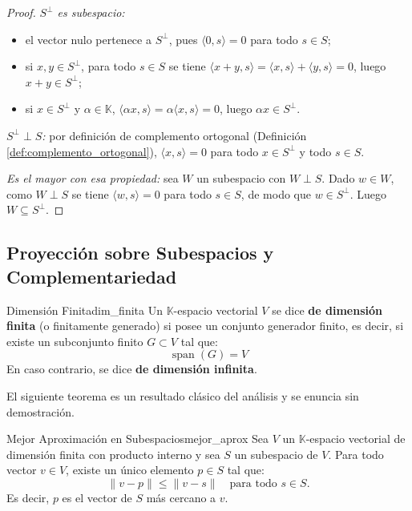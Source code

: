 \documentclass[11pt, a4paper]{article}
\begin{document}
\begin{proof}
\textit{$S^\perp$ es subespacio:}
\begin{itemize}
    \item el vector nulo pertenece a $S^\perp$, pues $\langle 0, s \rangle = 0$ para todo $s \in S$;
    \item si $x, y \in S^\perp$, para todo $s \in S$ se tiene $\langle x+y, s \rangle = \langle x, s \rangle + \langle y, s \rangle = 0$, luego $x+y \in S^\perp$;
    \item si $x \in S^\perp$ y $\alpha \in \mathbb{K}$, $\langle \alpha x, s \rangle = \alpha \langle x, s \rangle = 0$, luego $\alpha x \in S^\perp$.
\end{itemize}

\textit{$S^\perp \perp S$:} por definición de complemento ortogonal (Definición \ref{def:complemento_ortogonal}), $\langle x, s \rangle = 0$ para todo $x \in S^\perp$ y todo $s \in S$.

\textit{Es el mayor con esa propiedad:} sea $W$ un subespacio con $W \perp S$. Dado $w \in W$, como $W \perp S$ se tiene $\langle w, s \rangle = 0$ para todo $s \in S$, de modo que $w \in S^\perp$. Luego $W \subseteq S^\perp$.
\end{proof}

\subsection{Proyección sobre Subespacios y Complementariedad}

\begin{definicion}{Dimensión Finita}{dim_finita}
Un $\mathbb{K}$-espacio vectorial $V$ se dice \textbf{de dimensión finita} (o finitamente generado) si posee un conjunto generador finito, es decir, si existe un subconjunto finito $G \subset V$ tal que:
\[ \operatorname{span}(G) = V \]
En caso contrario, se dice \textbf{de dimensión infinita}.
\end{definicion}

El siguiente teorema es un resultado clásico del análisis y se enuncia sin demostración.

\begin{teorema}{Mejor Aproximación en Subespacios}{mejor_aprox}
Sea $V$ un $\mathbb{K}$-espacio vectorial de dimensión finita con producto interno y sea $S$ un subespacio de $V$.
Para todo vector $v \in V$, existe un único elemento $p \in S$ tal que:
\[ \|v - p\| \leq \|v - s\| \quad \text{para todo } s \in S. \]
Es decir, $p$ es el vector de $S$ más cercano a $v$.
\end{teorema}
\end{document}
